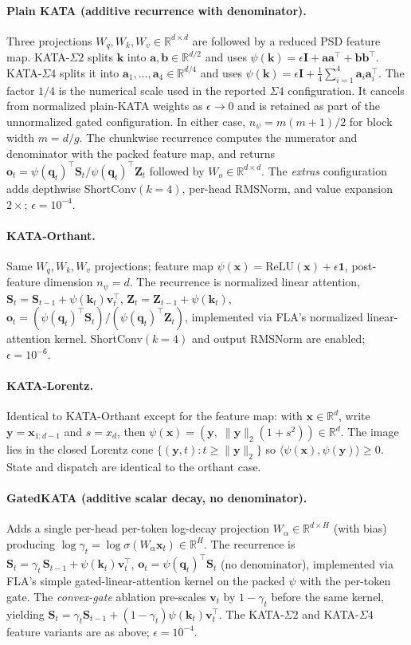 \documentclass{article}
\newcommand{\1}{\bm{1}}
\newcommand{\norm}[1]{\lVert {#1} \rVert}
\newcommand{\lrangle}[1]{\langle#1\rangle}
\def\eps{{\epsilon}}
\def\vone{{\bm{1}}}
\def\va{{\bm{a}}}
\def\vb{{\bm{b}}}
\def\vk{{\bm{k}}}
\def\vo{{\bm{o}}}
\def\vq{{\bm{q}}}
\def\vv{{\bm{v}}}
\def\vx{{\bm{x}}}
\def\vy{{\bm{y}}}
\def\mI{{\bm{I}}}
\def\mS{{\bm{S}}}
\def\mZ{{\bm{Z}}}
\newcommand{\R}{\mathbb{R}}
\theoremstyle{definition}
\begin{document}
\paragraph{Plain KATA (additive recurrence with denominator).}
Three projections $W_q,W_k,W_v\in\R^{d\times d}$ are followed by a reduced PSD feature map.
KATA-$\Sigma2$ splits $\vk$ into $\va,\vb\in\R^{d/2}$ and uses
$\psi(\vk)=\eps\mI+\va\va^\top+\vb\vb^\top$. KATA-$\Sigma4$ splits it into
$\va_1,\dots,\va_4\in\R^{d/4}$ and uses
$\psi(\vk)=\eps\mI+\tfrac14\sum_{i=1}^4\va_i\va_i^\top$. The factor $1/4$ is the numerical scale used in the reported $\Sigma4$ configuration. It cancels from normalized plain-KATA weights as $\eps\to0$ and is retained as part of the unnormalized gated configuration. In either case,
$n_\psi=m(m+1)/2$ for block width $m=d/g$. The chunkwise recurrence computes the numerator and
denominator with the packed feature map, and returns
$\vo_t=\psi(\vq_t)^\top\mS_t/\psi(\vq_t)^\top\mZ_t$ followed by
$W_o\in\R^{d\times d}$. The \emph{extras} configuration adds depthwise ShortConv$(k=4)$,
per-head RMSNorm, and value expansion $2\times$; $\eps=10^{-4}$.

\paragraph{KATA-Orthant.} Same $W_q,W_k,W_v$ projections; feature map $\psi(\vx)=\mathrm{ReLU}(\vx)+\eps\vone$, post-feature
dimension $n_\psi=d$. The recurrence is normalized linear attention,
\(\mS_t=\mS_{t-1}+\psi(\vk_t)\vv_t^\top\), \(\mZ_t=\mZ_{t-1}+\psi(\vk_t)\),
\(\vo_t=(\psi(\vq_t)^\top\mS_t)/(\psi(\vq_t)^\top\mZ_t)\), implemented via FLA's normalized linear-attention kernel. ShortConv$(k{=}4)$ and output $\mathrm{RMSNorm}$ are
enabled; $\eps=10^{-6}$.

\paragraph{KATA-Lorentz.} Identical to KATA-Orthant except for the feature map: with $\vx\in\R^d$, write $\vy=\vx_{1{:}d-1}$
and $s=x_d$, then $\psi(\vx)=(\vy,\;\norm{\vy}_2(1+s^2))\in\R^d$. The image lies in the closed
Lorentz cone $\{(\vy,t):t\ge\norm{\vy}_2\}$ so $\lrangle{\psi(\vx),\psi(\vy)}\ge 0$. State and
dispatch are identical to the orthant case.

\paragraph{GatedKATA (additive scalar decay, no denominator).} Adds a single per-head per-token log-decay projection $W_\alpha\in\R^{d\times H}$ (with bias)
producing $\log\gamma_t=\log\sigma(W_\alpha\vx_t)\in\R^H$. The recurrence is \(\mS_t =
\gamma_t\,\mS_{t-1} + \psi(\vk_t)\vv_t^\top\), \(\vo_t = \psi(\vq_t)^\top\mS_t\) (no denominator),
implemented via FLA's simple gated-linear-attention kernel on the packed $\psi$ with the per-token gate. The
\emph{convex-gate} ablation pre-scales $\vv_t$ by $1-\gamma_t$ before the same kernel, yielding
$\mS_t = \gamma_t\mS_{t-1} + (1-\gamma_t)\psi(\vk_t)\vv_t^\top$. The KATA-$\Sigma2$ and KATA-$\Sigma4$ feature variants are as above; $\eps=10^{-4}$.
\end{document}
